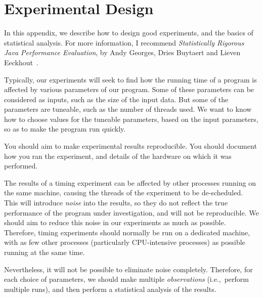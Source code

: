 \chapter{Experimental Design}
\label{app:experiments}

In this appendix, we describe how to design good experiments, and the basics
of statistical analysis.  For more information, I recommend
\emph{Statistically Rigorous Java Performance Evaluation}, by Andy Georges,
Dries Buytaert and Lieven Eeckhout~\cite{Georges+}.

Typically, our experiments will seek to find how the running time of a program
is affected by various parameters of our program.  Some of these parameters
can be considered as inputs, such as the size of the input data.  But some of
the parameters are tuneable, such as the number of threads used.  We want to
know how to choose values for the tuneable parameters, based on the input
parameters, so as to make the program run quickly. 


You should aim to make experimental results reproducible.  You should document
how you ran the experiment, and details of the hardware on which it was
performed.

The results of a timing experiment can be affected by other processes
running on the same machine, causing the threads of the experiment to be
de-scheduled.  This will introduce \emph{noise} into the results, so they do
not reflect the true performance of the program under investigation, and will
not be reproducible.
%
We should aim to reduce this noise in our experiments as much as possible.
Therefore, timing experiments should normally be run on a dedicated machine,
with as few other processes (particularly CPU-intensive processes) as possible
running at the same time.

Nevertheless, it will not be possible to eliminate noise completely.
Therefore, for each choice of parameters, we should make multiple
\emph{observations} (i.e.,~perform multiple runs), and then
perform a statistical analysis of the results.

